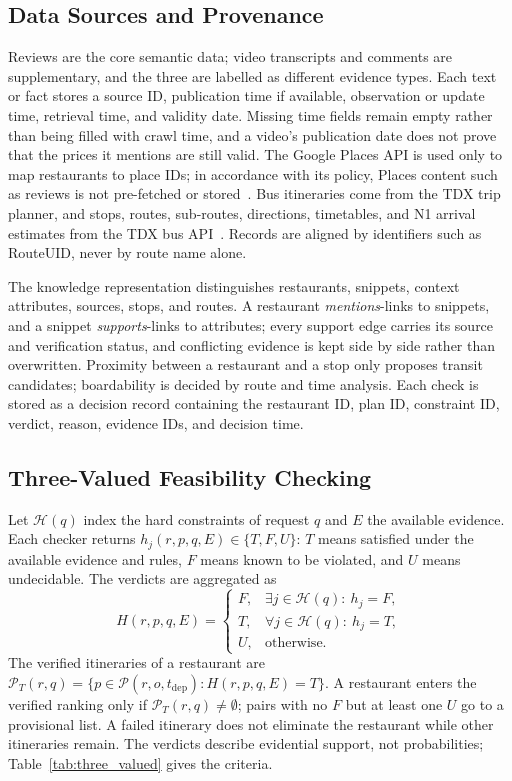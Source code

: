 \documentclass[conference]{IEEEtran}
\begin{document}
\subsection{Data Sources and Provenance}
Reviews are the core semantic data; video transcripts and comments are supplementary, and the three are labelled as different evidence types. Each text or fact stores a source ID, publication time if available, observation or update time, retrieval time, and validity date. Missing time fields remain empty rather than being filled with crawl time, and a video's publication date does not prove that the prices it mentions are still valid. The Google Places API is used only to map restaurants to place IDs; in accordance with its policy, Places content such as reviews is not pre-fetched or stored~\cite{google_places_policy}. Bus itineraries come from the TDX trip planner, and stops, routes, sub-routes, directions, timetables, and N1 arrival estimates from the TDX bus API~\cite{tdx_planner,tdx_bus}. Records are aligned by identifiers such as RouteUID, never by route name alone.

The knowledge representation distinguishes restaurants, snippets, context attributes, sources, stops, and routes. A restaurant \emph{mentions}-links to snippets, and a snippet \emph{supports}-links to attributes; every support edge carries its source and verification status, and conflicting evidence is kept side by side rather than overwritten. Proximity between a restaurant and a stop only proposes transit candidates; boardability is decided by route and time analysis. Each check is stored as a decision record containing the restaurant ID, plan ID, constraint ID, verdict, reason, evidence IDs, and decision time.

\subsection{Three-Valued Feasibility Checking}
Let $\mathcal{H}(q)$ index the hard constraints of request $q$ and $E$ the available evidence. Each checker returns $h_j(r,p,q,E)\in\{T,F,U\}$: $T$ means satisfied under the available evidence and rules, $F$ means known to be violated, and $U$ means undecidable. The verdicts are aggregated as
\begin{equation}
H(r,p,q,E)=
\begin{cases}
F, & \exists j\in\mathcal{H}(q):\ h_j=F,\\
T, & \forall j\in\mathcal{H}(q):\ h_j=T,\\
U, & \text{otherwise}.
\end{cases}
\end{equation}
The verified itineraries of a restaurant are $\mathcal{P}_T(r,q)=\{p\in\mathcal{P}(r,o,t_{\mathrm{dep}}):H(r,p,q,E)=T\}$. A restaurant enters the verified ranking only if $\mathcal{P}_T(r,q)\neq\emptyset$; pairs with no $F$ but at least one $U$ go to a provisional list. A failed itinerary does not eliminate the restaurant while other itineraries remain. The verdicts describe evidential support, not probabilities; Table~\ref{tab:three_valued} gives the criteria.
\end{document}
